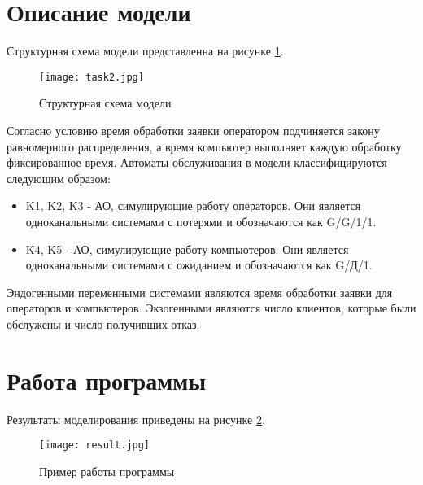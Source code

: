 \section{Описание модели}
	Структурная схема модели представленна на рисунке \ref{pic:scheme}.
	
	\begin{figure}[h]
		\begin{center}
			{\texttt{[image: task2.jpg]}
				\caption{Структурная схема модели}
				\label{pic:scheme}}
		\end{center}
	\end{figure}
	
	Согласно условию время обработки заявки оператором подчиняется закону равномерного распределения, а время компьютер выполняет каждую обработку фиксированное время. Автоматы обслуживания в модели классифицируются следующим образом:
	\begin{itemize}
		\item K1, K2, K3 - АО, симулирующие работу операторов. Они является одноканальными системами с потерями и обозначаются как G/G/1/1.
		\item K4, K5 - АО, симулирующие работу компьютеров. Они является одноканальными системами с ожиданием и обозначаются как G/Д/1.
	\end{itemize}

	Эндогенными переменными системами являются время обработки заявки для операторов и компьютеров. Экзогенными являются число клиентов, которые были обслужены и число получивших отказ.

\section{Работа программы}	
	Результаты моделирования приведены на рисунке \ref{pic:res}.
	
	\begin{figure}[h]
		\begin{center}
			{\texttt{[image: result.jpg]}
				\caption{Пример работы программы}
				\label{pic:res}}
		\end{center}
	\end{figure}
	